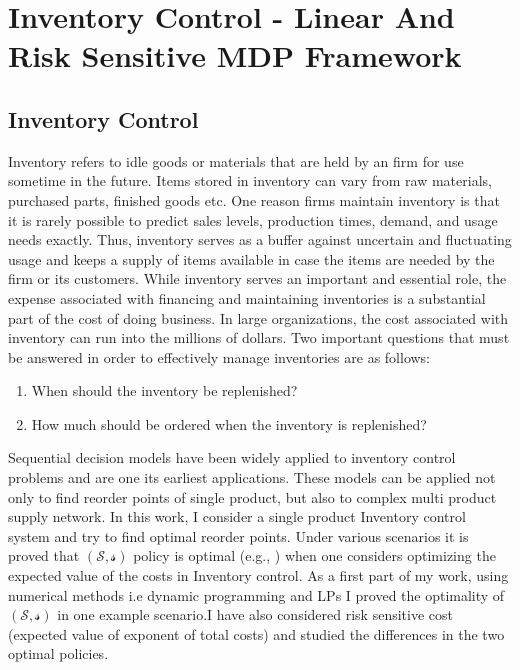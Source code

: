 \documentclass[11pt,a4paper,oneside]{report}
\begin{document}
\chapter{Inventory Control - Linear And Risk Sensitive MDP Framework}
\section{Inventory Control}
Inventory refers to idle goods or materials that are held by an firm for use sometime in the future. Items stored in inventory can vary from raw materials, purchased parts, finished goods etc. One reason firms maintain inventory is that it is rarely possible to predict sales levels, production times, demand, and usage needs exactly. Thus, inventory serves as a buffer against uncertain and fluctuating usage and keeps a supply of items available in case the items are needed by the firm or its customers. While inventory serves an important and essential role, the expense associated with financing and maintaining inventories is a substantial part of the cost of doing business. In large organizations, the cost associated with inventory can run into the millions of dollars.
Two important questions that must be answered in order to effectively manage inventories are as follows:
\begin{enumerate}
\item When should the inventory be replenished? 
\item How much should be ordered when the inventory is replenished?
\end{enumerate}

Sequential decision models have been widely applied to inventory control problems and are one its earliest applications. These models can be applied not only to find reorder points of single product, but also to complex multi product supply network. In this work, I consider a single product Inventory control system and try to find optimal reorder points. Under various scenarios it is proved that $\mathcal{(S,s)}$ policy is optimal (e.g., \citep{scarf1959optimality}) when one considers optimizing the expected value of the costs in Inventory control. As a first part of my work, using numerical methods i.e dynamic programming and LPs I proved the optimality of $\mathcal{(S,s)}$ in one example scenario.I have also considered risk sensitive cost (expected value of exponent of total costs) and studied the differences in the two optimal policies.
\end{document}
